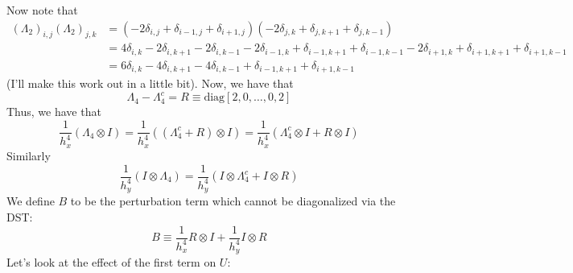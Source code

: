 \documentclass[reqno]{article}
\begin{document}
	Now note that
	\begin{equation}
	\begin{split}
		\left(\Lambda_2\right)_{i, j} \left(\Lambda_2\right)_{j, k} &= \left( -2\delta_{i, j} + \delta_{i - 1, j} + \delta_{i + 1, j} \right)\left( -2\delta_{j, k} + \delta_{j, k + 1} + \delta_{j, k - 1} \right) \\
		&= 4\delta_{i, k} - 2\delta_{i, k + 1} - 2\delta_{i, k - 1} - 2\delta_{i - 1, k} + \delta_{i - 1, k + 1} + \delta_{i - 1, k - 1} - 2\delta_{i + 1, k} + \delta_{i + 1, k + 1} + \delta_{i + 1, k - 1} \\
		&= 6 \delta_{i, k} - 4\delta_{i, k + 1} - 4\delta_{i, k - 1} + \delta_{i - 1, k + 1} + \delta_{i + 1, k - 1}
	\end{split}
	\end{equation}
	(I'll make this work out in a little bit).
	Now, we have that
	\begin{equation}
		\Lambda_4 - \Lambda_4^c = R \equiv \text{diag}[2, 0, \ldots, 0, 2]
	\end{equation}
	Thus, we have that
	\begin{equation}
		\frac{1}{h_x^4} \left( \Lambda_4 \otimes I \right) = \frac{1}{h_x^4} \left( (\Lambda_4^c + R) \otimes I \right) = \frac{1}{h_x^4} \left( \Lambda_4^c \otimes I + R \otimes I \right)
	\end{equation}
	Similarly
	\begin{equation}
		\frac{1}{h_y^4} \left( I \otimes \Lambda_4 \right) = \frac{1}{h_y^4} \left( I \otimes \Lambda_4^c + I\otimes R \right)
	\end{equation}
	We define $B$ to be the perturbation term which cannot be diagonalized via the DST:
	\begin{equation}
		B \equiv \frac{1}{h_x^4} R\otimes I + \frac{1}{h_y^4} I \otimes R
	\end{equation}
	Let's look at the effect of the first term on $U$:
\end{document}
